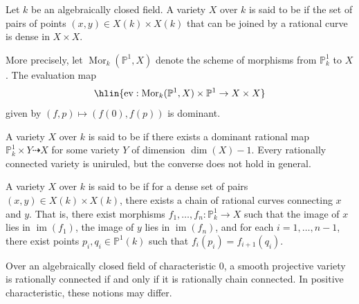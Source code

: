 \begin{definition} \label{definition:rationally_connected_variety_over_a_field}
Let $k$ be an algebraically closed field. A variety $X$ over $k$ is said to be  if the set of pairs of points $(x, y) \in X(k) \times X(k)$ that can be joined by a rational curve is dense in $X \times X$.

More precisely, let $\operatorname{Mor}_k(\mathbb{P}^1, X)$ denote the scheme of morphisms from $\mathbb{P}^1_k$ to $X$. The evaluation map
$$\hlin{\operatorname{ev}: \operatorname{Mor}_k(\mathbb{P}^1, X) \times \mathbb{P}^1 \to X \times X}$$
given by $(f, p) \mapsto (f(0), f(p))$ is dominant.

A variety $X$ over $k$ is said to be  if there exists a dominant rational map $\mathbb{P}^1_k \times Y \dashrightarrow X$ for some variety $Y$ of dimension $\dim(X) - 1$. Every rationally connected variety is uniruled, but the converse does not hold in general.

A variety $X$ over $k$ is said to be  if for a dense set of pairs $(x, y) \in X(k) \times X(k)$, there exists a chain of rational curves connecting $x$ and $y$. That is, there exist morphisms $f_1, \dots, f_n: \mathbb{P}^1_k \to X$ such that the image of $x$ lies in $\operatorname{im}(f_1)$, the image of $y$ lies in $\operatorname{im}(f_n)$, and for each $i = 1, \dots, n-1$, there exist points $p_i, q_i \in \mathbb{P}^1(k)$ such that $f_i(p_i) = f_{i+1}(q_i)$.

Over an algebraically closed field of characteristic $0$, a smooth projective variety is rationally connected if and only if it is rationally chain connected. In positive characteristic, these notions may differ.
\end{definition}

